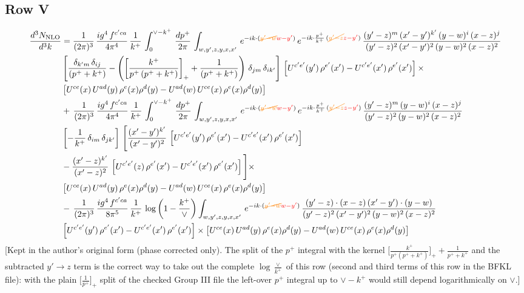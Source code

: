\documentclass[9pt]{article}
\numberwithin{equation}{section}
\begin{document}
\subsection{Row V}
\begin{align}
    \frac{d^{3}N_{\rm NLO}}{d^{3}k} & =  \frac{1}{(2\pi)^{3}}\, \frac{ig^{4}\,f^{c'ca}}{4\pi^{4}}\, \frac{1}{k^{+}}\,\int_{0}^{\vee-k^{+}}\, \frac{dp^{+}}{2\pi}\, \int_{w,y',z,y,x,x'}\, e^{-ik\cdot ({\color{orange}\cancel{y'-w}}{\color{red}w-y'})}\, e^{-ik\cdot \frac{p^{+}}{k^{+}}\,({\color{orange}\cancel{y'-z}}{\color{red}z-y'})}\,\frac{(y'-z)^{m}\,(x'-y')^{k'}\,(y-w)^{i}\,(x-z)^{j}}{(y'-z)^{2}\,(x'-y')^{2}\,(y-w)^{2}\,(x-z)^{2}}\notag \\ & \left[\frac{\delta_{k'm}\,\delta_{ij}}{(p^{+}+k^{+})}-\left(\left[\frac{k^{+}}{p^{+}\,(p^{+}+k^{+})}\right]_{+}+\frac{1}{(p^{+}+k^{+})}\right)\,\delta_{jm}\,\delta_{ik'}\right]\, \left[U^{c'e'}(y')\,\rho^{e'}(x')-U^{c'e'}(x')\,\rho^{e'}(x')\right]\times \notag \\ &  \left[U^{ce}(x)\,U^{ad}(y)\,\rho^{e}(x)\rho^{d}(y)-U^{ad}(w)\,U^{ce}(x)\,\rho^{e}(x)\rho^{d}(y)\right] \notag \\
&   +\,\frac{1}{(2\pi)^{3}}\, \frac{ig^{4}\,f^{c'ca}}{4\pi^{4}}\, \frac{1}{k^{+}}\,\int_{0}^{\vee-k^{+}}\, \frac{dp^{+}}{2\pi}\, \int_{w,y',z,y,x,x'}\, e^{-ik\cdot ({\color{orange}\cancel{y'-w}}{\color{red}w-y'})}\, e^{-ik\cdot \frac{p^{+}}{k^{+}}\,({\color{orange}\cancel{y'-z}}{\color{red}z-y'})}\,\frac{(y'-z)^{m}\,(y-w)^{i}\,(x-z)^{j}}{(y'-z)^{2}\,(y-w)^{2}\,(x-z)^{2}}\notag \\ &   \left[-\frac{1}{k^{+}}\, \delta_{im}\, \delta_{jk'}\right]\, \Bigg[\frac{(x'-y')^{k'}}{(x'-y')^{2}}\,\left[U^{c'e'}(y')\,\rho^{e'}(x')-U^{c'e'}(x')\,\rho^{e'}(x')\right]\notag \\ & -\frac{(x'-z)^{k'}}{(x'-z)^{2}}\,\left[U^{c'e'}(z)\,\rho^{e'}(x')-U^{c'e'}(x')\,\rho^{e'}(x')\right]\Bigg]\times \notag \\ &    \left[U^{ce}(x)\,U^{ad}(y)\,\rho^{e}(x)\rho^{d}(y)-U^{ad}(w)\,U^{ce}(x)\,\rho^{e}(x)\rho^{d}(y)\right] \notag \\
& -\,\frac{1}{(2\pi)^{3}}\, \frac{ig^{4}\,f^{c'ca}}{8\pi^{5}}\, \frac{1}{k^{+}}\,\log{\left(1-\frac{k^{+}}{\vee}\right)} \int_{w,y',z,y,x,x'}\, e^{-ik\cdot ({\color{orange}\cancel{y'-w}}{\color{red}w-y'})}\,\frac{(y'-z)\cdot (x-z)\,(x'-y')\cdot (y-w)}{(y'-z)^{2}\,(x'-y')^{2}\,(y-w)^{2}\,(x-z)^{2}}\notag \\ & \left[U^{c'e'}(y')\,\rho^{e'}(x')-U^{c'e'}(x')\,\rho^{e'}(x')\right]\times  \left[U^{ce}(x)\,U^{ad}(y)\,\rho^{e}(x)\rho^{d}(y)-U^{ad}(w)\,U^{ce}(x)\,\rho^{e}(x)\rho^{d}(y)\right]
\end{align} {\color{red}[Kept in the author's original form (phase corrected only). The split of the $p^{+}$ integral with the kernel $\big[\frac{k^{+}}{p^{+}(p^{+}+k^{+})}\big]_{+}+\frac{1}{p^{+}+k^{+}}$ and the subtracted $y'\to z$ term is the correct way to take out the complete $\log\frac{\vee}{k^{+}}$ of this row (second and third terms of this row in the BFKL file): with the plain $\big[\frac{1}{p^{+}}\big]_{+}$ split of the checked Group III file the left-over $p^{+}$ integral up to $\vee-k^{+}$ would still depend logarithmically on $\vee$.]}\par\noindent
\end{document}
